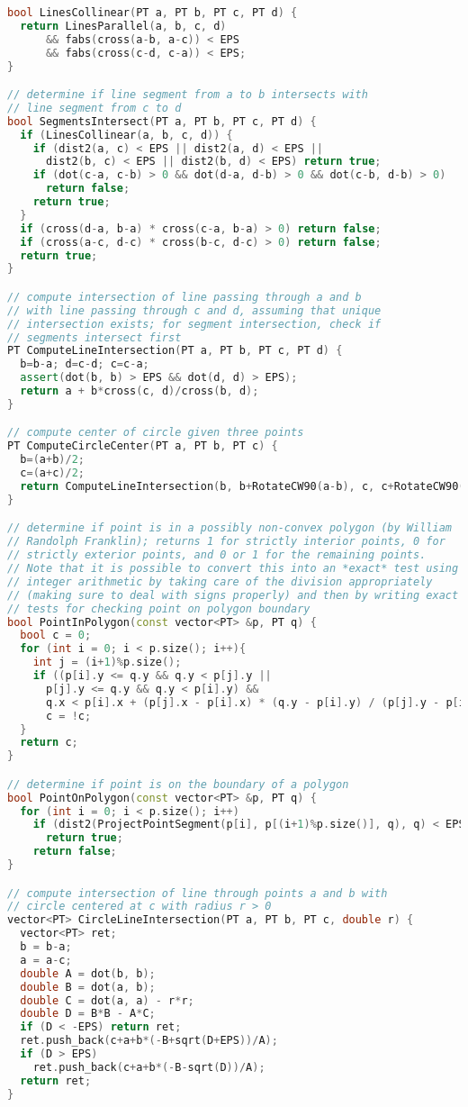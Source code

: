 \begin{lstlisting}[language=C++]
bool LinesCollinear(PT a, PT b, PT c, PT d) { 
  return LinesParallel(a, b, c, d)
      && fabs(cross(a-b, a-c)) < EPS
      && fabs(cross(c-d, c-a)) < EPS; 
}

// determine if line segment from a to b intersects with 
// line segment from c to d
bool SegmentsIntersect(PT a, PT b, PT c, PT d) {
  if (LinesCollinear(a, b, c, d)) {
    if (dist2(a, c) < EPS || dist2(a, d) < EPS ||
      dist2(b, c) < EPS || dist2(b, d) < EPS) return true;
    if (dot(c-a, c-b) > 0 && dot(d-a, d-b) > 0 && dot(c-b, d-b) > 0)
      return false;
    return true;
  }
  if (cross(d-a, b-a) * cross(c-a, b-a) > 0) return false;
  if (cross(a-c, d-c) * cross(b-c, d-c) > 0) return false;
  return true;
}

// compute intersection of line passing through a and b
// with line passing through c and d, assuming that unique
// intersection exists; for segment intersection, check if
// segments intersect first
PT ComputeLineIntersection(PT a, PT b, PT c, PT d) {
  b=b-a; d=c-d; c=c-a;
  assert(dot(b, b) > EPS && dot(d, d) > EPS);
  return a + b*cross(c, d)/cross(b, d);
}

// compute center of circle given three points
PT ComputeCircleCenter(PT a, PT b, PT c) {
  b=(a+b)/2;
  c=(a+c)/2;
  return ComputeLineIntersection(b, b+RotateCW90(a-b), c, c+RotateCW90(a-c));
}

// determine if point is in a possibly non-convex polygon (by William
// Randolph Franklin); returns 1 for strictly interior points, 0 for
// strictly exterior points, and 0 or 1 for the remaining points.
// Note that it is possible to convert this into an *exact* test using
// integer arithmetic by taking care of the division appropriately
// (making sure to deal with signs properly) and then by writing exact
// tests for checking point on polygon boundary
bool PointInPolygon(const vector<PT> &p, PT q) {
  bool c = 0;
  for (int i = 0; i < p.size(); i++){
    int j = (i+1)%p.size();
    if ((p[i].y <= q.y && q.y < p[j].y || 
      p[j].y <= q.y && q.y < p[i].y) &&
      q.x < p[i].x + (p[j].x - p[i].x) * (q.y - p[i].y) / (p[j].y - p[i].y))
      c = !c;
  }
  return c;
}

// determine if point is on the boundary of a polygon
bool PointOnPolygon(const vector<PT> &p, PT q) {
  for (int i = 0; i < p.size(); i++)
    if (dist2(ProjectPointSegment(p[i], p[(i+1)%p.size()], q), q) < EPS)
      return true;
    return false;
}

// compute intersection of line through points a and b with
// circle centered at c with radius r > 0
vector<PT> CircleLineIntersection(PT a, PT b, PT c, double r) {
  vector<PT> ret;
  b = b-a;
  a = a-c;
  double A = dot(b, b);
  double B = dot(a, b);
  double C = dot(a, a) - r*r;
  double D = B*B - A*C;
  if (D < -EPS) return ret;
  ret.push_back(c+a+b*(-B+sqrt(D+EPS))/A);
  if (D > EPS)
    ret.push_back(c+a+b*(-B-sqrt(D))/A);
  return ret;
}


\end{lstlisting}
